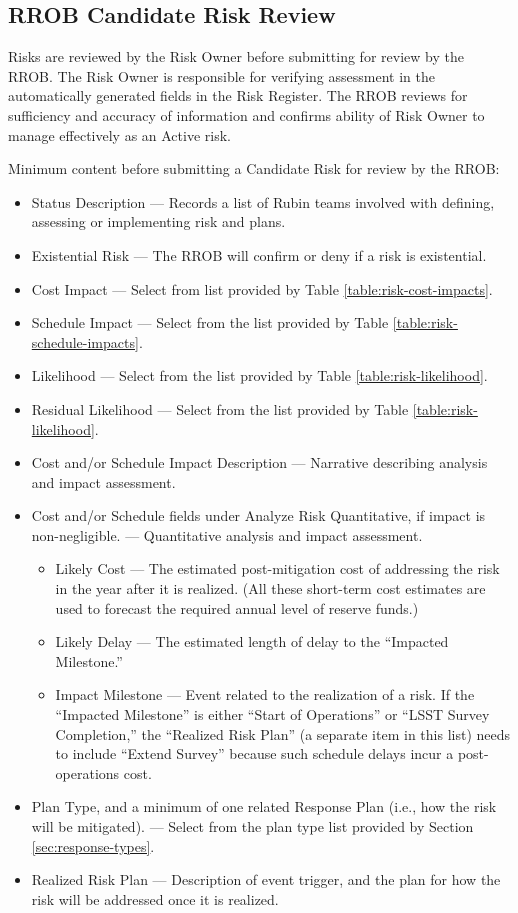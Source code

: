 \subsection{RROB Candidate Risk Review}
\label{sec:risk-review}

Risks are reviewed by the Risk Owner before submitting for review by the RROB.
The Risk Owner is responsible for verifying assessment in the automatically generated fields in the Risk Register.
The RROB reviews for sufficiency and accuracy of information and confirms ability of Risk Owner to manage effectively as an Active risk.

Minimum content before submitting a Candidate Risk for review by the RROB:
\begin{itemize}
	\item Status Description --- Records a list of Rubin teams involved with defining, assessing or implementing risk and plans.
	\item Existential Risk --- The RROB will confirm or deny if a risk is existential.
	\item Cost Impact --- Select from list provided by Table \ref{table:risk-cost-impacts}.
	\item Schedule Impact --- Select from the list provided by Table \ref{table:risk-schedule-impacts}.
	\item Likelihood --- Select from the list provided by Table \ref{table:risk-likelihood}.
	\item Residual Likelihood --- Select from the list provided by Table \ref{table:risk-likelihood}.
	\item Cost and/or Schedule Impact Description --- Narrative describing analysis and impact assessment.
	\item Cost and/or Schedule fields under Analyze Risk Quantitative, if impact is non-negligible. --- Quantitative analysis and impact assessment.
		\begin{itemize}
			\item Likely Cost --- The estimated post-mitigation cost of addressing the risk in the year after it is realized.
			(All these short-term cost estimates are used to forecast the required annual level of reserve funds.)
			\item Likely Delay --- The estimated length of delay to the ``Impacted Milestone.''
			\item Impact Milestone --- Event related to the realization of a risk.
			If the ``Impacted Milestone'' is either ``Start of Operations'' or ``LSST Survey Completion,'' the ``Realized Risk Plan'' (a separate item in this list) needs to include ``Extend Survey'' because such schedule delays incur a post-operations cost.
		\end{itemize}
	\item Plan Type, and a minimum of one related Response Plan (i.e., how the risk will be mitigated). --- Select from the plan type list provided by Section \ref{sec:response-types}.
	\item Realized Risk Plan --- Description of event trigger, and the plan for how the risk will be addressed once it is realized.
\end{itemize}

